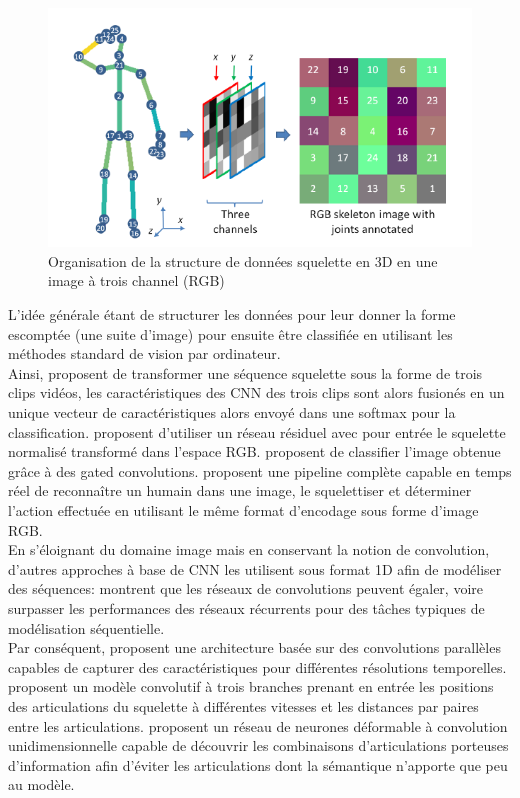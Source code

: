 \begin{figure}[H]
    \centering
    \includegraphics[width=0.5\linewidth]{Images/skeltoim.png}
    \caption{Organisation de la structure de données squelette en 3D en une image à trois channel (RGB)}
    \label{fig:skeltoim}
\end{figure}
L’idée générale étant de structurer les données pour leur donner la forme escomptée (une suite d’image) pour ensuite être classifiée en utilisant les méthodes standard de vision par ordinateur.\\


Ainsi, \cite{ke2017new} proposent de transformer une séquence squelette sous la forme de trois clips vidéos, les caractéristiques des CNN des trois clips sont alors fusionés en un unique vecteur de caractéristiques alors envoyé dans une softmax pour la classification.
\cite{pham2018learning} proposent d'utiliser un réseau résiduel \cite{he2016deep} avec pour entrée le squelette normalisé transformé dans l'espace RGB.
\cite{cao2018skeleton} proposent de classifier l'image obtenue grâce à des gated convolutions.
\cite{ludl2019simple} proposent une pipeline complète capable en temps réel de reconnaître un humain dans une image, le squelettiser et déterminer l'action effectuée en utilisant le même format d'encodage sous forme d'image RGB.\\

En s'éloignant du domaine image mais en conservant la notion de convolution, d'autres approches à base de CNN les utilisent sous format 1D afin de modéliser des séquences:
\cite{bai2018empirical} montrent que les réseaux de convolutions peuvent égaler, voire surpasser les performances des réseaux récurrents pour des tâches typiques de modélisation séquentielle.\\

Par conséquent, \cite{devineau2018deep} proposent une architecture basée sur des convolutions parallèles capables de capturer des caractéristiques pour différentes résolutions temporelles.
\cite{2019arXiv190709658Y} proposent un modèle convolutif à trois branches prenant en entrée les positions des articulations du squelette à différentes vitesses et les distances par paires entre les articulations.
\cite{weng2018deformable} proposent un réseau de neurones déformable à convolution unidimensionnelle capable de découvrir les combinaisons d'articulations porteuses d'information afin d'éviter les articulations dont la sémantique n'apporte que peu au modèle.



